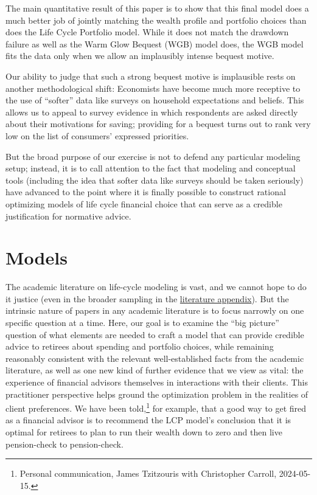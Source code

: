 \documentclass{article}
\begin{document}
The main quantitative result of this paper is to show that this final model does a much better job of jointly matching the wealth profile and portfolio choices than does the Life Cycle Portfolio model. While it does not match the drawdown failure as well as the Warm Glow Bequest (WGB) model does, the WGB model fits the data only when we allow an implausibly intense bequest motive.

Our ability to judge that such a strong bequest motive is implausible rests on another methodological shift: Economists have become much more receptive to the use of ``softer'' data like surveys on household expectations and beliefs.
This allows us to appeal to survey evidence in which respondents are asked directly about their motivations for saving; providing for a bequest turns out to rank very low on the list of consumers' expressed priorities.

But the broad purpose of our exercise is not to defend any particular modeling setup; instead, it is to call attention to the fact that modeling and conceptual tools (including the idea that softer data like surveys should be taken seriously) have advanced to the point where it is finally possible to construct rational optimizing models of life cycle financial choice that can serve as a credible justification for normative advice.

\section{Models}\label{models}

The academic literature on life-cycle modeling is vast, and we cannot hope to do it justice (even in the broader sampling in the \href{/lit-review}{literature appendix}).
But the intrinsic nature of papers in any academic literature is to focus narrowly on one specific question at a time.
Here, our goal is to examine the ``big picture'' question of what elements are needed to craft a model that can provide credible advice to retirees about spending and portfolio choices, while remaining reasonably consistent with the relevant well-established facts from the academic literature, as well as one new kind of further evidence that we view as vital: the experience of financial advisors themselves in interactions with their clients. This practitioner perspective helps ground the optimization problem in the realities of client preferences.
We have been told,\footnote{Personal communication, James Tzitzouris with Christopher Carroll, 2024-05-15.} for example, that a good way to get fired as a financial advisor is to recommend the LCP model's conclusion that it is optimal for retirees to plan to run their wealth down to zero and then live pension-check to pension-check.
\end{document}
